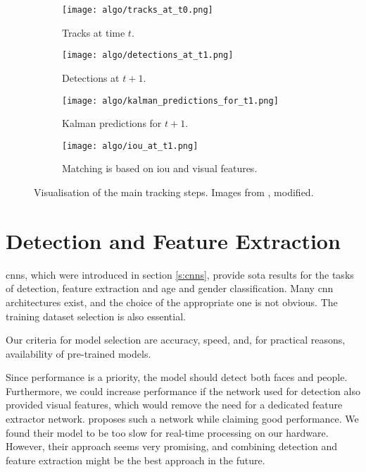 \begin{figure}[htb]
    \newcommand{\mysize}{0.4\textwidth}
     \centering
     \begin{subfigure}[b]{\mysize}
         \centering
         \texttt{[image: algo/tracks\_at\_t0.png]}
         \caption{Tracks at time $t$.}
         \label{fig:tracks_at_t0}
     \end{subfigure}
     \hfill
     \begin{subfigure}[b]{\mysize}
         \centering
         \texttt{[image: algo/detections\_at\_t1.png]}
         \caption{Detections at $t + 1$.}
         \label{fig:detections_at_t1}
     \end{subfigure}
     \hfill
     \begin{subfigure}[b]{\mysize}
         \centering
         \texttt{[image: algo/kalman\_predictions\_for\_t1.png]}
         \caption{Kalman predictions for $t + 1$.}
         \label{fig:kalman_predictions_for_t1}
     \end{subfigure}
     \hfill
     \begin{subfigure}[b]{\mysize}
         \centering
         \texttt{[image: algo/iou\_at\_t1.png]}
         \caption{Matching is based on \gls{iou} and visual features.}
         \label{fig:matching_at_t1}
     \end{subfigure}
     
    \caption[Visualisation of the main tracking steps.]{Visualisation of the main tracking steps. Images from \cite{MOT16}, modified.}
    \label{fig:simplified_algorithm}
\end{figure}


\section{Detection and Feature Extraction}

\Glspl{cnn}, which were introduced in section \ref{s:cnns}, provide \gls{sota} results for the tasks of detection, feature extraction and age and gender classification. Many \gls{cnn} architectures exist, and the choice of the appropriate one is not obvious. The training dataset selection is also essential.

Our criteria for model selection are accuracy, speed, and, for practical reasons, availability of pre-trained models.

Since performance is a priority, the model should detect both faces and people. Furthermore, we could increase performance if the network used for detection also provided visual features, which would remove the need for a dedicated feature extractor network. \cite{zhang2020fair} proposes such a network while claiming good performance. We found their model to be too slow for real-time processing on our hardware. However, their approach seems very promising, and combining detection and feature extraction might be the best approach in the future.

